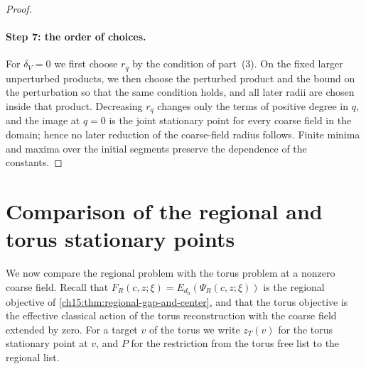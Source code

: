 \begin{proof}
\paragraph{Step 7: the order of choices.}
For $\delta_V=0$ we first choose $r_q$ by the condition of part~(3). On the fixed larger unperturbed products, we then choose the perturbed product and the bound on the perturbation so that the same condition holds, and all later radii are chosen inside that product. Decreasing $r_q$ changes only the terms of positive degree in $q$, and the image at $q=0$ is the joint stationary point for every coarse field in the domain; hence no later reduction of the coarse-field radius follows. Finite minima and maxima over the initial segments preserve the dependence of the constants.
\end{proof}

\section{Comparison of the regional and torus stationary points}\label{ch16:sec:comparison}

We now compare the regional problem with the torus problem at a nonzero coarse field. Recall that $F_R(c,z;\xi)=E_{d_0}(\Psi_R(c,z;\xi))$ is the regional objective of \cref{ch15:thm:regional-gap-and-center}, and that the torus objective is the effective classical action of the torus reconstruction with the coarse field extended by zero. For a target $v$ of the torus we write $z_T(v)$ for the torus stationary point at $v$, and $P$ for the restriction from the torus free list to the regional list.

